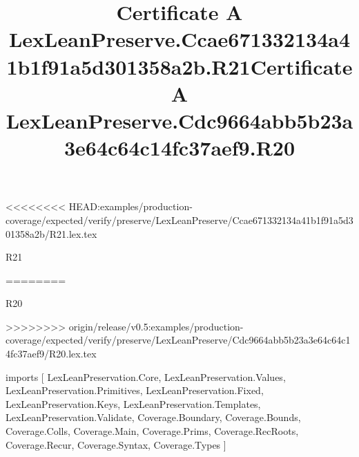 <<<<<<<< HEAD:examples/production-coverage/expected/verify/preserve/LexLeanPreserve/Ccae671332134a41b1f91a5d301358a2b/R21.lex.tex
\begin{lexlean}{R21}
\title{Certificate A LexLeanPreserve.Ccae671332134a41b1f91a5d301358a2b.R21}
========
\begin{lexlean}{R20}
\title{Certificate A LexLeanPreserve.Cdc9664abb5b23a3e64c64c14fc37aef9.R20}
>>>>>>>> origin/release/v0.5:examples/production-coverage/expected/verify/preserve/LexLeanPreserve/Cdc9664abb5b23a3e64c64c14fc37aef9/R20.lex.tex
\begin{coremodule}
imports [
  LexLeanPreservation.Core,
  LexLeanPreservation.Values,
  LexLeanPreservation.Primitives,
  LexLeanPreservation.Fixed,
  LexLeanPreservation.Keys,
  LexLeanPreservation.Templates,
  LexLeanPreservation.Validate,
  Coverage.Boundary,
  Coverage.Bounds,
  Coverage.Colls,
  Coverage.Main,
  Coverage.Prims,
  Coverage.RecRoots,
  Coverage.Recur,
  Coverage.Syntax,
  Coverage.Types
]


\end{coremodule}
\end{lexlean}
\end{lexlean}
